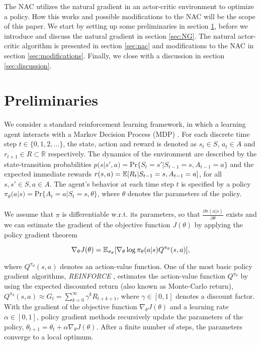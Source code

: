 The NAC utilizes the natural gradient in an actor-critic environment to optimize a policy. How this works and possible modifications to the NAC will be the scope of this paper. We start by setting up some preliminaries in section \ref{sec:preliminaries}, before we introduce and discuss the natural gradient in section \ref{sec:NG}. The natural actor-critic algorithm is presented in section \ref{sec:nac} and modifications to the NAC in section \ref{sec:modifications}. Finally, we close with a discussion in section \ref{sec:discussion}.


\section{Preliminaries}
\label{sec:preliminaries}

We consider a standard reinforcement learning framework, in which a learning agent interacts with a Markov Decision Process (MDP) \citep{howard1960dynamic, sutton2018reinforcement}. For each discrete time step $t \in \{0,1,2,...\}$, the state, action and reward is denoted as $s_t \in \mathit{S}$, $a_t \in A$ and $r_{t+1} \in \mathit{R} \subset \mathbb{R}$ respectively. The dynamics of the environment are described by the state-transition probabilities $p(s|s', a) = \text{Pr}\{S_t = s' | S_{t-1} = s, A_{t-1} = a\}$ and the expected immediate rewards $r(s, a) = \operatorname{\mathbb{E}}[R_t | S_{t-1} = s, A_{t-1} = a]$, for all $s, s' \in S, a \in A$. The agent's behavior at each time step $t$ is specified by a policy $\pi_{\theta}(a|s) = \text{Pr}\{A_t = a | S_{t} = s, \theta\}$, where $\theta$ denotes the parameters of the policy. 
\\\\
We assume that $\pi$ is differentiable w.r.t. its parameters, so that $\tfrac{\partial\pi(a|s)}{\partial \theta}$ exists and we can estimate the gradient of the objective function $J(\theta)$ by applying the policy gradient theorem \citep{sutton2000policy}

\begin{equation}
\label{equ:policygradienttheorem}
\nabla_{\theta}J(\theta)=\operatorname{\mathbb{E}}_{\pi_{\theta}}[\nabla_{\theta}\log\pi_{\theta}(a|s) Q^{\pi_{\theta}}(s, a)],
\end{equation}

\noindent where $Q^{\pi_{\theta}}(s, a)$ denotes an action-value function. One of the most basic policy gradient algorithms, \textit{REINFORCE} \citep{williams1992simple}, estimates the action-value function $Q^{\pi_{\theta}}$ by using the expected discounted return (also known as Monte-Carlo return), \(Q^{\pi_\theta}(s, a) \approx \mathit{G}_t = \sum_{k=0}^{\infty}\gamma^k R_{t+k+1}\),
where $\gamma \in [0, 1]$ denotes a discount factor. With the gradient of the objective function $\nabla_{\theta}J(\theta)$ and a learning rate $\alpha \in \left[0,1\right]$, policy gradient methods recursively update the parameters of the policy, $\theta_{t+1} = \theta_t + \alpha \nabla_{\theta} J(\theta)$. After a finite number of steps, the parameters converge to a local optimum. 

